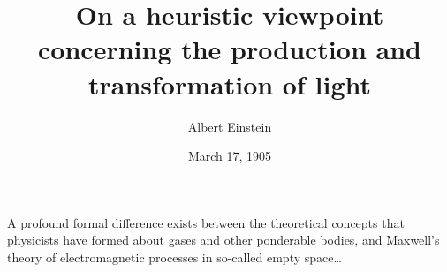 \documentclass[british]{article} %
\title{%
  On a heuristic viewpoint concerning the production and
  transformation of light}
\author{Albert Einstein}
\date{March 17, 1905}
\begin{document}
\maketitle
A profound formal difference exists between the theoretical
concepts that physicists have formed about gases and other
ponderable bodies, and Maxwell's theory of electromagnetic
processes in so-called empty space\dots
\end{document}
